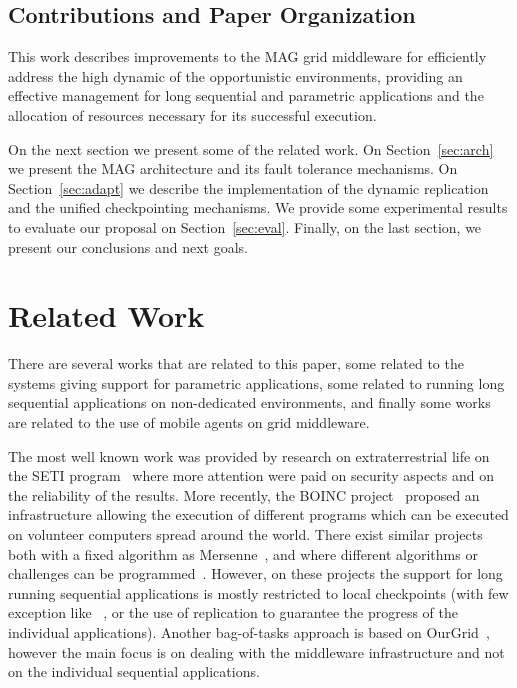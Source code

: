 \documentclass[times, 09pt, twocolumn]{article}
\begin{document}
\subsection{Contributions and Paper Organization}

This work describes improvements to the MAG grid middleware for
efficiently address the high dynamic of the opportunistic
environments, providing an effective management for long sequential and
parametric applications and the allocation of resources necessary for its
successful execution.

On the next section we present some of the related work. On
Section~\ref{sec:arch} we present the MAG architecture and its fault tolerance
mechanisms. On Section~\ref{sec:adapt} we describe the implementation
of the dynamic replication and the unified checkpointing mechanisms. We provide
some experimental results to evaluate our proposal on Section~\ref{sec:eval}.
Finally, on the last section, we present our conclusions and next goals.



\section{Related Work}

There are several works that are related to this paper, some related to the
systems giving support for parametric applications, some related to
running long sequential applications on non-dedicated environments, and finally
some works are related to the use of mobile agents on grid middleware.

The most well known work was provided by research on extraterrestrial life on
the SETI program~\cite{seti} where more attention were paid on security aspects
and on the reliability of the results. More recently, the BOINC
project~\cite{boinc} proposed an infrastructure allowing the execution of
different programs which can be executed on volunteer computers spread around
the world. There exist similar projects both with a fixed algorithm as
Mersenne~\cite{mersenne}, and where different algorithms or challenges can be
programmed~\cite{distributed}. However, on these projects the support for long
running sequential applications is mostly restricted to local checkpoints (with
few exception like~ \cite{climate}, or the use of replication to guarantee the
progress of the individual applications). Another bag-of-tasks approach is
based on OurGrid~\cite{cirne06}, however the main focus is on dealing with
the middleware infrastructure and not on the individual sequential
applications.
\end{document}
